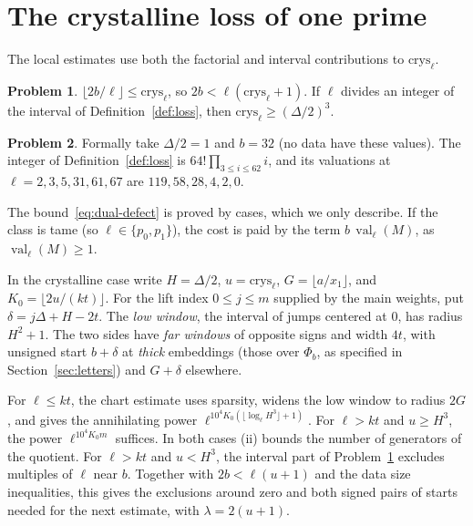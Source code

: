 \documentclass[reqno]{amsart}
\theoremstyle{definition}
\newtheorem{problem}{Problem}[section]
\theoremstyle{plain}
\newcommand{\val}{\operatorname{val}}
\newcommand{\crys}{\mathrm{crys}}
\newcommand{\half}{(\Delta/2)}
\begin{document}
\section{The crystalline loss of one prime}\label{sec:one-prime}

The local estimates use both the factorial and interval contributions to \(\crys_\ell\).

\begin{problem}\label{pr:crys}
\(\lfloor 2b/\ell\rfloor \le \crys_\ell\), so \(2b < \ell(\crys_\ell + 1)\).  If \(\ell\) divides an integer of the interval of Definition~\ref{def:loss}, then \(\crys_\ell \ge \half^3\).
\end{problem}

\begin{problem}\label{pr:model-integer}
Formally take \(\Delta/2 = 1\) and \(b = 32\) (no data have these values).  The integer of Definition~\ref{def:loss} is \(64!\prod_{3 \le i \le 62} i\), and its valuations at \(\ell = 2, 3, 5, 31, 61, 67\) are \(119, 58, 28, 4, 2, 0\).
\end{problem}

The bound~\eqref{eq:dual-defect} is proved by cases, which we only describe.  If the class is tame (so \(\ell \in \{p_0, p_1\}\)), the cost is paid by the term \(b\,\val_\ell(M)\), as \(\val_\ell(M) \ge 1\).

In the crystalline case write \(H=\Delta/2\), \(u=\crys_\ell\), \(G=\lfloor a/x_1\rfloor\), and \(K_0=\lfloor2u/(kt)\rfloor\).  For the lift index \(0\le j\le m\) supplied by the main weights, put \(\delta=j\Delta+H-2t\).  The \emph{low window}, the interval of jumps centered at \(0\), has radius \(H^2+1\).  The two sides have \emph{far windows} of opposite signs and width \(4t\), with unsigned start \(b+\delta\) at \emph{thick} embeddings (those over \(\Phi_b\), as specified in Section~\ref{sec:letters}) and \(G+\delta\) elsewhere.

For \(\ell\le kt\), the chart estimate uses sparsity, widens the low window to radius \(2G\), and gives the annihilating power \(\ell^{10^4 K_0(\lfloor\log_\ell H^3\rfloor+1)}\).  For \(\ell>kt\) and \(u\ge H^3\), the power \(\ell^{10^4 K_0m}\) suffices.  In both cases (ii) bounds the number of generators of the quotient.  For \(\ell>kt\) and \(u<H^3\), the interval part of Problem~\ref{pr:crys} excludes multiples of \(\ell\) near \(b\).  Together with \(2b<\ell(u+1)\) and the data size inequalities, this gives the exclusions around zero and both signed pairs of starts needed for the next estimate, with \(\lambda=2(u+1)\).
\end{document}
